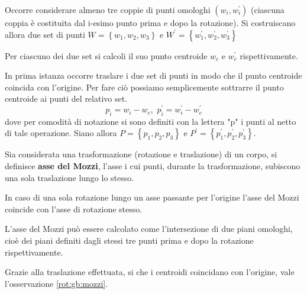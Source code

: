 Occorre considerare almeno tre coppie di punti omologhi $(w_i, w_i^{'})$ (ciascuna coppia è costituita dal i-esimo punto prima e dopo la rotazione). Si costruiscano allora due set di punti $W = \left\lbrace w_1, w_2, w_3 \right\rbrace$ e $W^{'} = \left\lbrace w_1^{'}, w_2^{'}, w_3^{'} \right\rbrace$

Per ciascuno dei due set si calcoli il suo punto centroide $w_c$ e $w_c^{'}$ rispettivamente.

In prima istanza occorre traslare i due set di punti in modo che il punto centroide coincida con l'origine. Per fare ciò possiamo semplicemente sottrarre il punto centroide ai punti del relativo set.
\begin{equation}
p_i = w_i - w_c, \, \, 
p_i^{'} = w_i^{'} - w_c^{'}
\end{equation}
dove per comodità di notazione si sono definiti con la lettera "p" i punti al netto di tale operazione. Siano allora $P = \left\lbrace p_1, p_2, p_3 \right\rbrace$ e $P^{'} = \left\lbrace p_1^{'}, p_2^{'}, p_3^{'} \right\rbrace$.

\begin{defn}
	Sia considerata una trasformazione (rotazione e traslazione) di un corpo, si definisce \textbf{asse del Mozzi}, l'asse i cui punti, durante la trasformazione, subiscono una sola traslazione lungo lo stesso. 
\end{defn}

\begin{obs}
	\label{rot:gb:mozzi}
	In caso di una sola rotazione lungo un asse passante per l'origine l'asse del Mozzi coincide con l'asse di rotazione stesso.
	
	L'asse del Mozzi può essere calcolato come l'intersezione di due piani omologhi, cioè dei piani definiti dagli stessi tre punti prima e dopo la rotazione rispettivamente.
\end{obs}

Grazie alla traslazione effettuata, si che i centroidi coincidano con l'origine, vale l'osservazione \ref{rot:gb:mozzi}.

